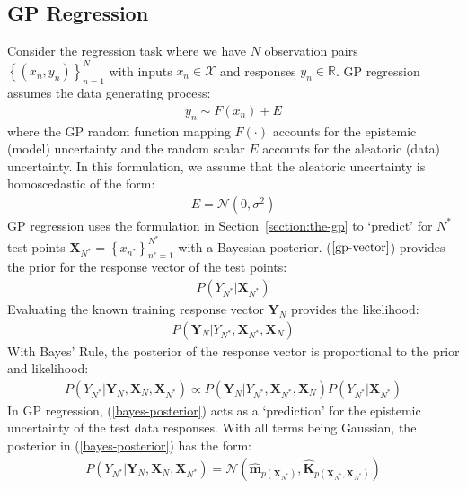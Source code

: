 \documentclass{article}
\numberwithin{equation}{section}
\begin{document}
\subsection{GP Regression}
Consider the regression task where we have $N$ observation pairs $\left\{(x_n, y_n)\right\}_{n=1}^{N}$ with inputs $x_n \in \mathcal{X}$ and responses $y_n \in \mathbb{R}$. GP regression assumes the data generating process:
\begin{align}
    y_n \sim F(x_n) + E
    \label{regression-data-uncertainties}
\end{align}
where the GP random function mapping $F(\cdot)$ accounts for the epistemic (model) uncertainty and the random scalar $E$ accounts for the aleatoric (data) uncertainty. In this formulation, we assume that the aleatoric uncertainty is homoscedastic of the form:
\begin{align}
    E = \mathcal{N} \left(0, \sigma^2\right)
    \label{aleotric-uncertainty}
\end{align}
GP regression uses the formulation in Section~\ref{section:the-gp} to `predict' for $N^*$ test points $\mathbf{X}_{N^*} = \left\{ x_{n^*}\right\}_{n^*=1}^{N^*}$ with a Bayesian posterior. ($\ref{gp-vector}$) provides the prior for the response vector of the test points:
\begin{align}
    \label{gp-prior}
    P\left(Y_{N^*}\vert \mathbf{X}_{N^*}\right)
\end{align}
Evaluating the known training response vector $\mathbf{Y}_{N}$ provides the likelihood:
\begin{align}
     \label{gp-likelihood}
    P\left(\mathbf{Y}_{N} \vert Y_{N^*}, \mathbf{X}_{N^*}, \mathbf{X}_{N} \right)
\end{align}
With Bayes' Rule, the posterior of the response vector is proportional to the prior and likelihood:
\begin{align}
     P\left(Y_{N^*} | \mathbf{Y}_{N},  \mathbf{X}_{N},  \mathbf{X}_{N^*}\right) \propto P\left(\mathbf{Y}_{N} \vert Y_{N^*}, \mathbf{X}_{N^*}, \mathbf{X}_{N} \right) P\left(Y_{N^*}\vert \mathbf{X}_{N^*}\right)
    \label{bayes-posterior}
\end{align}
In GP regression, (\ref{bayes-posterior}) acts as a `prediction' for the epistemic uncertainty of the test data responses. With all terms being Gaussian, the posterior in (\ref{bayes-posterior}) has the form:
\begin{align}
    P\left(Y_{N^*} | \mathbf{Y}_{N},  \mathbf{X}_{N},  \mathbf{X}_{N^*}\right)  =  \mathcal{N}\left(\hat{\mathbf{m}}_{p(\mathbf{X}_{N^*})}, \hat{\mathbf{K}}_{p(\mathbf{X}_{N^*}, \mathbf{X}_{N^*})}\right)
    \label{gp-epistemic-posterior}
\end{align}
\end{document}
